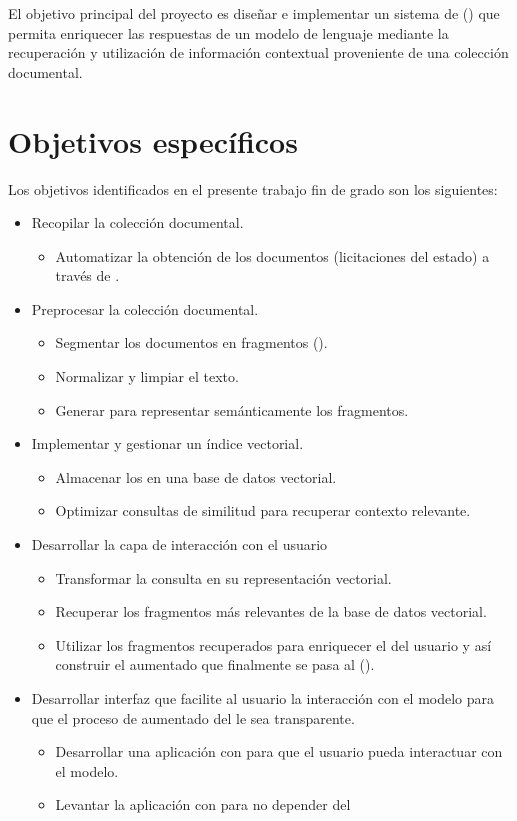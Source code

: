 
El objetivo principal del proyecto es diseñar e implementar un sistema de  () que permita enriquecer las respuestas de un modelo de lenguaje mediante la recuperación y utilización de información contextual proveniente de una colección documental. 

\section{Objetivos específicos}
Los objetivos identificados en el presente trabajo fin de grado son los siguientes:
\begin{itemize}
\tightlist
\item Recopilar la colección documental.
	\begin{itemize}
		\item Automatizar la obtención de los documentos (licitaciones del estado) a través de .
	\end{itemize}
\item Preprocesar la colección documental.
	\begin{itemize} 
		\item Segmentar los documentos en fragmentos ().
		\item Normalizar y limpiar el texto.
		\item Generar  para representar semánticamente los fragmentos.
	\end{itemize}
	\item Implementar y gestionar un índice vectorial.
	\begin{itemize}
		\item Almacenar los  en una base de datos vectorial.
		\item Optimizar consultas de similitud para recuperar contexto relevante.
	\end{itemize}
\item Desarrollar la capa de interacción con el usuario
	\begin{itemize}
		\item Transformar la consulta en su representación vectorial.
		\item Recuperar los fragmentos más relevantes de la base de datos vectorial.
		\item Utilizar los fragmentos recuperados para enriquecer el  del usuario y así construir el  aumentado que finalmente se pasa al  ().
	\end{itemize}
\item Desarrollar interfaz que facilite al usuario la interacción con el modelo para que el proceso de aumentado del  le sea transparente.
	\begin{itemize}
		\item Desarrollar una aplicación con  para que el usuario pueda interactuar con el modelo.
		\item Levantar la aplicación  con  para no depender del 
	\end{itemize}
\end{itemize}

